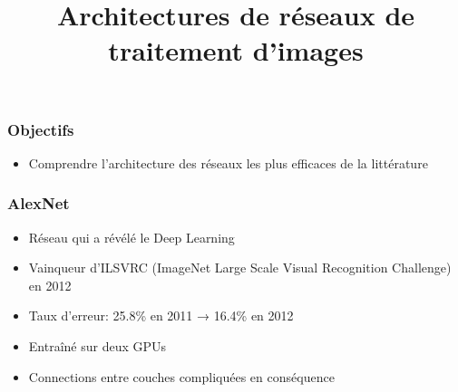 \documentclass{formation}
\title{Architectures de réseaux de traitement d'images}
\begin{document}
\maketitle

\begin{frame}
  \frametitle{Objectifs}
  \begin{itemize}
  \item Comprendre l'architecture des réseaux les plus efficaces de la
    littérature
  \end{itemize}
\end{frame}

\begin{frame}
  \frametitle{AlexNet}
  \begin{itemize}
  \item Réseau qui a révélé le Deep Learning~\cite{Krizhevsky2012}
  \item Vainqueur d'ILSVRC (ImageNet Large Scale Visual Recognition
    Challenge) en 2012
  \item Taux d'erreur: 25.8\% en 2011 → 16.4\% en 2012
  \item Entraîné sur deux GPUs
  \item Connections entre couches compliquées en conséquence
  \end{itemize}
\end{frame}
\end{document}

